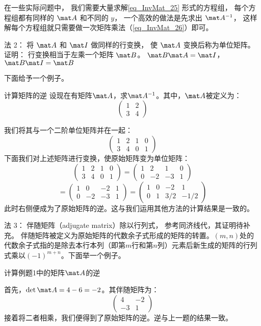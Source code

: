 在一些实际问题中， 我们需要大量求解\autoref{eq_InvMat_25} 形式的方程组， 每个方程组都有同样的 $\mat A$ 和不同的 $y$， 一个高效的做法是先求出 $\mat A^{-1}$， 这样解每个方程组就只需要做一次矩阵乘法（\autoref{eq_InvMat_26}）即可。

法 2： 将 $\mat A$ 和 $\mat I$ 做同样的行变换， 使 $\mat A$ 变换后称为单位矩阵。 
证明： 行变换相当于左乘一个矩阵 $\mat B$。 $\mat B\mat A = \mat I$， $\mat B \mat I = \mat B$

下面给予一个例子。
\begin{example}{计算矩阵的逆}
设现在有矩阵$\mat A$，求$\mat A^{-1}$。其中，$\mat A$被定义为：
$$
\left(
    \begin{matrix}
    1&2\\
    3&4
    \end{matrix}
\right)
$$
\end{example}
我们将其与一个二阶单位矩阵并在一起：
$$
\left(
    \begin{matrix}
    1&2&1&0\\
    3&4&0&1
    \end{matrix}
\right)
$$
下面我们对上述矩阵进行变换，使原始矩阵变为单位矩阵：
$$
\left(
    \begin{matrix}
    1&2&1&0\\
    3&4&0&1
    \end{matrix}\right)=\left(
    \begin{matrix}
    1&2&1&0\\
    0&-2&-3&1
    \end{matrix}\right)$$
    $$
    =\left(
    \begin{matrix}
    1&0&-2&1\\
    0&-2&-3&1
    \end{matrix}\right)=\left(
    \begin{matrix}
    1&0&-2&1\\
    0&1&3/2&-1/2
    \end{matrix}
\right)
$$
此时右侧便成为了原始矩阵的逆。这与我们运用其他方法的计算结果是一致的。

法 3： 伴随矩阵（adjugate matrix）除以行列式， 参考同济线代，其证明待补充。%
伴随矩阵被定义为原始矩阵的代数余子式形成的矩阵的转置。$(m,n)$处的代数余子式指的是除去本行本列（即第$m$行和第$n$列）元素后新生成的矩阵的行列式乘以$(-1)^{m+n}$。下面举一个例子。
\begin{example}{计算例题1中的矩阵$\mat A$的逆}
\end{example}
首先，$\det\mat A=4-6=-2$。其伴随矩阵为：
$$
\left(
\begin{matrix}
4&-2\\
-3&1
\end{matrix}
\right)
$$
接着将二者相乘，我们便得到了原始矩阵的逆。逆与上一题的结果一致。